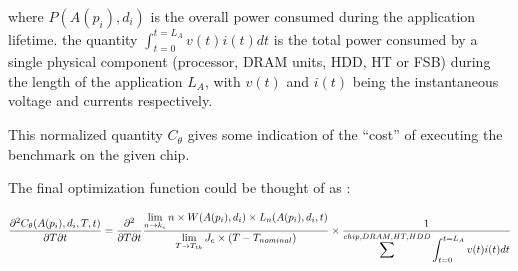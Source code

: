 \documentclass[11pt]{amsart}
\begin{document}
where $P(A(p_i),d_i)$ is the overall power consumed during the application lifetime. the quantity $\int_{t=0}^{t=L_A}v(t)i(t)dt$ is the total power consumed by a single physical component (processor, DRAM units, HDD, HT or FSB) during the length of the application $L_A$, with $v(t)$ and $i(t)$ being the instantaneous voltage and currents respectively. 

This normalized quantity $C_\theta$ gives some indication of the ``cost'' of executing the benchmark on the given chip. 

The final optimization function could be thought of as :

\[
\frac{\partial^2 C_{\theta}(A(p_i), d_i, T, t)}{\partial T \partial t} = \frac{\partial^2}{\partial T \partial t} \frac{\displaystyle \lim_{n \to k_e }n \times W(A(p_i),d_i) \times L_n(A(p_i),d_i,t)}{\displaystyle \lim_{T \to T_{th}} J_e \times (T - T_{nominal})} \\
											       \times \frac{1}{\displaystyle \sum^{chip,DRAM,HT,HDD} \int_{t=0}^{t=L_A}v(t)i(t)dt} 
\]
\end{document}
